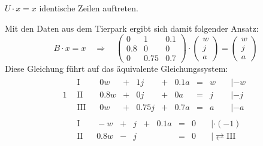 \begin{exercise}
\begin{enumerate}[a)]
            $U\cdot x=x$ identische Zeilen auftreten.
            \par
            Mit den Daten aus dem Tierpark ergibt
            sich damit folgender Ansatz:
            \begin{equation*}
              B\cdot x=x
              \quad\Rightarrow\quad
              \begin{pmatrix}
                \num{0}   & \num{1}    & \num{0.1} \\
                \num{0.8} & \num{0}    & \num{0}   \\
                \num{0}   & \num{0.75} & \num{0.7}
              \end{pmatrix}
              \cdot
              \begin{pmatrix}
                w \\
                j \\
                a
              \end{pmatrix}
              =
              \begin{pmatrix}
                w \\
                j \\
                a
              \end{pmatrix}
            \end{equation*}
            Diese Gleichung führt auf das
            äquivalente Gleichungssystem:
            \begingroup
              \renewcommand{\arraycolsep}{2pt}%
              \begin{alignat*}{1}
                &
                \begin{array}{r|rcrcrcll}
                  \text{I}\;\;&\;   \num{0}w & + &    \num{1}j & + & \num{0.1}a & = & w & \quad|-w \\
                 \text{II}\;\;&\; \num{0.8}w & + &    \num{0}j & + &   \num{0}a & = & j & \quad|-j \\
                \text{III}\;\;&\;   \num{0}w & + & \num{0.75}j & + & \num{0.7}a & = & a & \quad|-a
                \end{array}
                \\[1ex] &
                \begin{array}{r|rcrcrcll}
                  \text{I}\;\;&\;         -w & + &           j & + & \num{0.1}a & = & 0 & \quad|\cdot(-1)                  \\
                 \text{II}\;\;&\; \num{0.8}w & - &           j &   &            & = & 0 & \quad|\rightleftarrows\text{III} \\

\end{array}
\end{alignat*}
\end{enumerate}
\end{exercise}
